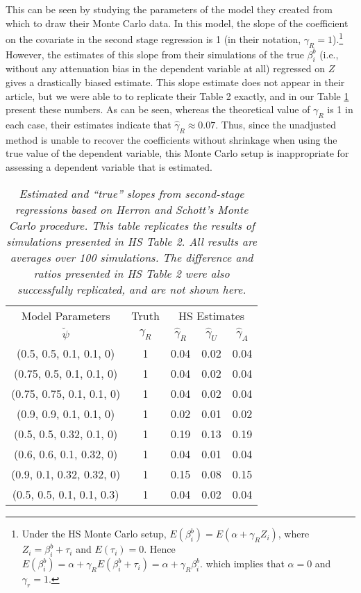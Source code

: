 \documentclass[11pt,titlepage]{article}
\begin{document}
This can be seen by studying the parameters of the model they created
from which to draw their Monte Carlo data.  In this model, the slope
of the coefficient on the covariate in the second stage regression is
1 (in their notation, $\gamma_R=1$).\footnote{Under the HS Monte Carlo
  setup, $E(\beta_i^b)=E(\alpha+\gamma_R Z_i)$, where
  $Z_i=\beta_i^b+\tau_i$ and $E(\tau_i)=0$.  Hence
  $E(\beta_i^b)=\alpha+\gamma_RE(\beta_i^b+\tau_i)=\alpha+\gamma_R\beta_i^b$.
  which implies that $\alpha=0$ and $\gamma_r=1$.}  However, the
estimates of this slope from their simulations of the true $\beta_i^b$
(i.e., without any attenuation bias in the dependent variable at all)
regressed on $Z$ gives a drastically biased estimate.  This slope
estimate does not appear in their article, but we were able to to
replicate their Table 2 exactly, and in our Table \ref{t:hsrep}
present these numbers.  As can be seen, whereas the theoretical value
of $\gamma_R$ is 1 in each case, their estimates indicate that
$\hat\gamma_R\approx 0.07$.  Thus, since the unadjusted method is
unable to recover the coefficients without shrinkage when using the
true value of the dependent variable, this Monte Carlo setup is
inappropriate for assessing a dependent variable that is estimated.
\begin{table}[tb]
\label{t:hsrep}
\begin{center}
\begin{tabular}{cc|c c c}
Model Parameters & Truth & \multicolumn{3}{c}{HS Estimates} \\
$\breve\psi$  & $\gamma_R$ & $\hat\gamma_R$  &       $\hat\gamma_U$ & $\hat\gamma_A$ \\\hline
(0.5, 0.5, 0.1, 0.1, 0)&1 &       0.04    &       0.02    &       0.04        \\
(0.75, 0.5, 0.1, 0.1, 0) &1       &       0.04    &       0.02    &       0.04        \\
(0.75, 0.75, 0.1, 0.1, 0) &1      &       0.04    &       0.02    &       0.04     \\
(0.9, 0.9, 0.1, 0.1, 0) &1&       0.02    &       0.01    &       0.02          \\
(0.5, 0.5, 0.32, 0.1, 0) &1       &       0.19    &       0.13    &       0.19        \\
(0.6, 0.6, 0.1, 0.32, 0) &1       &       0.04    &       0.01    &       0.04     \\
(0.9, 0.1, 0.32, 0.32, 0)&1       &       0.15    &       0.08    &       0.15        \\
(0.5, 0.5, 0.1, 0.1, 0.3)&1       &       0.04    &       0.02    &       0.04     \\
\hline
\end{tabular}
\end{center}
\caption{\em Estimated and ``true'' slopes from 
second-stage regressions based on Herron and Schott's Monte Carlo 
procedure. This table replicates the results of simulations presented in
HS Table 2.  All results are averages over 100 simulations.  
The difference and ratios presented in HS Table 2 were also 
successfully replicated, and are not shown here.}
\end{table}
\end{document}
